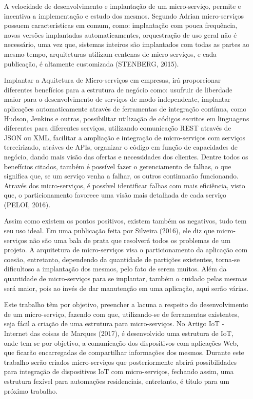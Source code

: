 \documentclass[journal]{IEEEtran}
\begin{document}
A velocidade de desenvolvimento e implantação de um micro-serviço, permite e incentiva a implementação e estudo dos mesmos. Segundo Adrian micro-serviços possuem características em comum, como: implantação com pouca frequência, novas versões implantadas automaticamentes, orquestração de uso geral não é necessário, uma vez que, sistemas inteiros são implantados com todas as partes ao mesmo tempo, arquiteturas utilizam centenas de micro-serviços, e cada publicação, é altamente customizada (STENBERG, 2015).

Implantar a Aquitetura de Micro-serviços em empresas, irá proporcionar diferentes benefícios para a estrutura de negócio como: usufruir de liberdade maior para o desenvolvimento de serviços de modo independente, implantar aplicações automaticamente através de ferramentas de integração contínua, como Hudson, Jenkins e outras, possibilitar utilização de códigos escritos em linguagens diferentes para diferentes serviços, utilizando comunicação REST através de JSON ou XML, facilitar a ampliação e integração de micro-serviços com serviços terceirizado, atráves de APIs, organizar o código em função de capacidades de negócio, dando mais visão das ofertas e necessidades dos clientes. Dentre todos os benefícios citados, também é possível fazer o gerenciamento de falhas, o que significa que, se um serviço venha a falhar, os outros continuarão funcionando. Através dos micro-serviços, é possível identificar falhas com mais eficiência, visto que, o particionamento favorece uma visão mais detalhada de cada serviço (PELOI, 2016).

Assim como existem os pontos positivos, existem também os negativos, tudo tem seu uso ideal. Em uma publicação feita por Silveira (2016), ele diz que micro-serviços não são uma bala de prata que resolverá todos os problemas de um projeto. A arquitetura de micro-serviços visa o particionamento da aplicação com coesão, entretanto, dependendo da quantidade de partições existentes, torna-se dificultoso a implantação dos mesmos, pelo fato de serem muitos. Além da quantidade de micro-serviços para se implantar, também o cuidado pelas mesmas será maior, pois ao invés de dar manutenção em uma aplicação, aqui serão várias.

Este trabalho têm por objetivo, preencher a lacuna a respeito do desenvolvimento de um micro-serviço, fazendo com que, utilizando-se de ferramentas existentes, seja fácil a criação de uma estrutura para micro-serviços. No Artigo IoT - Internet das coisas de Marques (2017), é desenvolvido uma estrutura de IoT, onde tem-se por objetivo, a comunicação dos dispositivos com aplicações Web, que ficarão encarregadas de compartilhar informações dos mesmos. Durante este trabalho serão criados micro-serviços que posteriormente abrirá possibilidades para integração de dispositivos IoT com micro-serviços, fechando assim, uma estrutura fexível para automações residenciais, entretanto, é título para um próximo trabalho.
\end{document}

